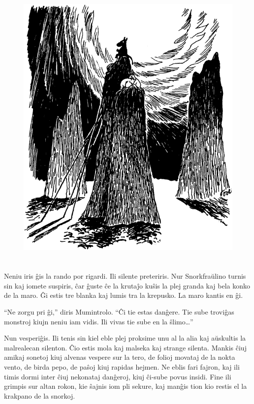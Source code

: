 \begin{figure}[htbp]
\centering
\includegraphics[width=350pt,height=413pt]{7-8.png}
\caption{}
\label{7-8}
\end{figure}

Neniu iris ĝis la rando por rigardi. Ili silente preteriris. Nur Snorkfraŭlino turnis sin kaj iomete suspiris, ĉar ĝuste ĉe la krutaĵo kuŝis la plej granda kaj bela konko de la maro. Ĝi estis tre blanka kaj lumis tra la krepusko. La maro kantis en ĝi.

``Ne zorgu pri ĝi,'' diris Mumintrolo. ``Ĉi tie estas danĝere. Tie sube troviĝas monstroj kiujn neniu iam vidis. Ili vivas tie sube en la ŝlimo{\ldots}''

Nun vesperiĝis. Ili tenis sin kiel eble plej proksime unu al la alia kaj aŭskultis la malrealecan silenton. Ĉio estis mola kaj malseka kaj strange silenta. Mankis ĉiuj amikaj sonetoj kiuj alvenas vespere sur la tero, de folioj movataj de la nokta vento, de birda pepo, de paŝoj kiuj rapidas hejmen. Ne eblis fari fajron, kaj ili timis dormi inter ĉiuj nekonataj danĝeroj, kiuj ĉi-sube povus insidi. Fine ili grimpis sur altan rokon, kie ŝajnis iom pli sekure, kaj manĝis tion kio restis el la krakpano de la snorkoj.

